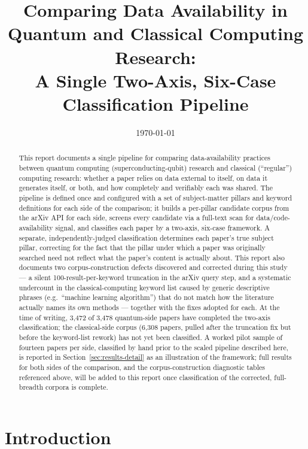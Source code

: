 \documentclass[11pt]{article}
\title{Comparing Data Availability in Quantum and Classical Computing Research:\\
A Single Two-Axis, Six-Case Classification Pipeline}
\author{}
\date{\today}
\begin{document}
\maketitle

\begin{abstract}
This report documents a single pipeline for comparing data-availability practices
between quantum computing (superconducting-qubit) research and classical
(``regular'') computing research: whether a paper relies on data external to itself,
on data it generates itself, or both, and how completely and verifiably each was
shared. The pipeline is defined once and configured with a set of subject-matter
pillars and keyword definitions for each side of the comparison; it builds a
per-pillar candidate corpus from the arXiv API for each side, screens every candidate
via a full-text scan for data/code-availability signal, and classifies each paper by a
two-axis, six-case framework. A separate, independently-judged classification
determines each paper's true subject pillar, correcting for the fact that the pillar
under which a paper was originally searched need not reflect what the paper's content
is actually about. This report also documents two corpus-construction defects
discovered and corrected during this study --- a silent 100-result-per-keyword
truncation in the arXiv query step, and a systematic undercount in the
classical-computing keyword list caused by generic descriptive phrases (e.g.\
``machine learning algorithm'') that do not match how the literature actually names
its own methods --- together with the fixes adopted for each. At the time of writing,
3{,}472 of 3{,}478 quantum-side papers have completed the two-axis classification; the
classical-side corpus (6{,}308 papers, pulled after the truncation fix but before the
keyword-list rework) has not yet been classified. A worked pilot sample of fourteen
papers per side, classified by hand prior to the scaled pipeline described here, is
reported in Section~\ref{sec:results-detail} as an illustration of the framework; full
results for both sides of the comparison, and the corpus-construction diagnostic
tables referenced above, will be added to this report once classification of the
corrected, full-breadth corpora is complete.
\end{abstract}

\section{Introduction}
\end{document}
